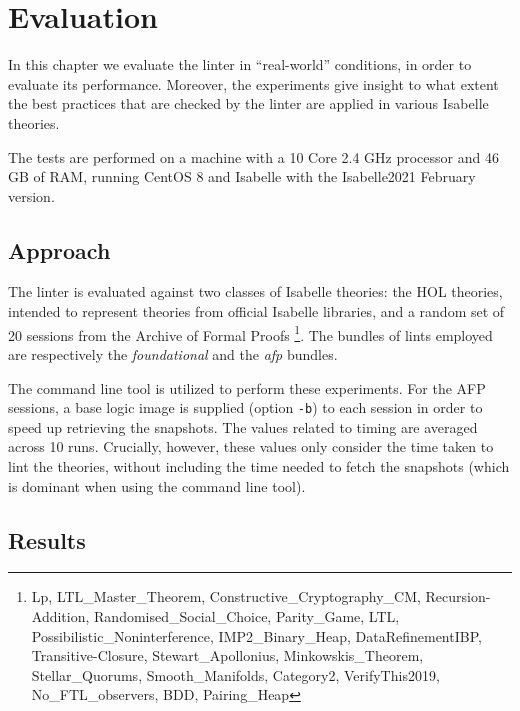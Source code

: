 \chapter{Evaluation}\label{chapter:evaluation}
In this chapter we evaluate the linter in ``real-world'' conditions, in
order to evaluate its performance. Moreover, the experiments give insight to
what extent the best practices that are checked by the linter are applied
in various Isabelle theories.

The tests are performed on a machine with a 10 Core 2.4 GHz processor and 46 
GB of RAM, running CentOS 8 and Isabelle with the Isabelle2021 February version.

\section{Approach}
The linter is evaluated against two classes of Isabelle theories:
the HOL theories, intended to represent theories from official Isabelle
libraries, and a random set of 20 sessions from the Archive of Formal 
Proofs \footnote{Lp, LTL\_Master\_Theorem, Constructive\_Cryptography\_CM, Recursion-Addition, Randomised\_Social\_Choice, Parity\_Game, LTL, Possibilistic\_Noninterference, IMP2\_Binary\_Heap, DataRefinementIBP, Transitive-Closure, Stewart\_Apollonius, Minkowskis\_Theorem, Stellar\_Quorums, Smooth\_Manifolds, Category2, VerifyThis2019, No\_FTL\_observers, BDD, Pairing\_Heap}. The bundles of lints employed
are respectively the \textit{foundational} and the \textit{afp} bundles.

The command line tool is utilized
to perform these experiments. For the AFP sessions, a base logic image
is supplied (option \texttt{-b}) to each session in order to speed up 
retrieving the snapshots. The values related to timing
are averaged across 10 runs. Crucially, however, these values only 
consider
the time taken to lint the theories, without including the time
needed to fetch the snapshots (which is dominant when using the
command line tool). 

\section{Results}
